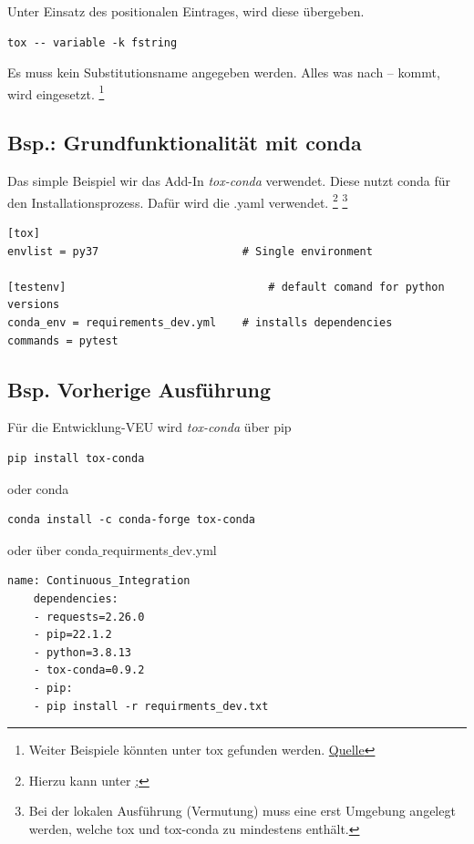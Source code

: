Unter Einsatz des positionalen Eintrages, wird diese übergeben.
\begin{lstlisting}[style=CMD, caption={Nur fstrings tests werden ausgeführt}, captionpos=b]
tox -- variable -k fstring
\end{lstlisting}
Es muss kein Substitutionsname angegeben werden. Alles was nach -- kommt, wird eingesetzt. \footnote{
	Weiter Beispiele könnten unter tox gefunden werden. \href{https://tox.wiki/en/latest/example/pytest.html}{Quelle}
}

\subsection{Bsp.: Grundfunktionalität mit conda}
Das simple Beispiel wir das Add-In \textit{tox-conda} verwendet. Diese nutzt conda für den Installationsprozess. Dafür wird die \gls{.yaml} verwendet. \footnote{
	Hierzu kann unter \href{https://github.com/tox-dev/tox-conda/pull/48 mehr nachgelesen werden.}; 
}
\footnote{
	Bei der lokalen Ausführung (Vermutung) muss eine erst Umgebung angelegt werden, welche tox und tox-conda zu mindestens enthält.
}

\begin{lstlisting}[style=Config]
[tox]
envlist = py37						# Single environment

[testenv]								# default comand for python versions
conda_env = requirements_dev.yml	# installs dependencies
commands = pytest 
\end{lstlisting}


\subsection{Bsp. Vorherige Ausführung}
Für die Entwicklung-\gls{VEU} wird \textit{tox-conda} über pip 
\begin{lstlisting}[style=CMD]
pip install tox-conda
\end{lstlisting}
oder conda 
\begin{lstlisting}[style=CMD]
conda install -c conda-forge tox-conda
\end{lstlisting}
oder über conda$\_$requirments$\_$dev.yml
\begin{lstlisting}[style=Config, caption={Conda-Requirment-Dev für tox-conda}, captionpos=b]
	name: Continuous_Integration
	dependencies:
	- requests=2.26.0
	- pip=22.1.2
	- python=3.8.13
	- tox-conda=0.9.2
	- pip:
	- pip install -r requirments_dev.txt
\end{lstlisting}

